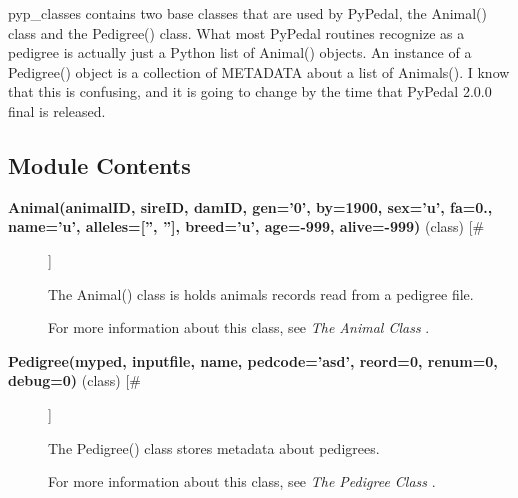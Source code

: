 

 pyp\_classes contains two base classes that are used by PyPedal, the Animal() class and the Pedigree() class. What most PyPedal routines recognize as a pedigree is actually just a Python list of Animal() objects. An instance of a Pedigree() object is a collection of METADATA about a list of Animals(). I know that this is confusing, and it is going to change by the time that PyPedal 2.0.0 final is released.
\subsection*{Module Contents}
\begin{description}
\item[\textbf{Animal(animalID, sireID, damID, gen='0', by=1900, sex='u', fa=0., name='u', alleles=['', ''], breed='u', age=-999, alive=-999)}
 (class) [\#]]

 The Animal() class is holds animals records read from a pedigree file.


 For more information about this class, see \emph{The Animal Class}
.

\item[\textbf{Pedigree(myped, inputfile, name, pedcode='asd', reord=0, renum=0, debug=0)}
 (class) [\#]]

 The Pedigree() class stores metadata about pedigrees.


 For more information about this class, see \emph{The Pedigree Class}
.


\end{description}
